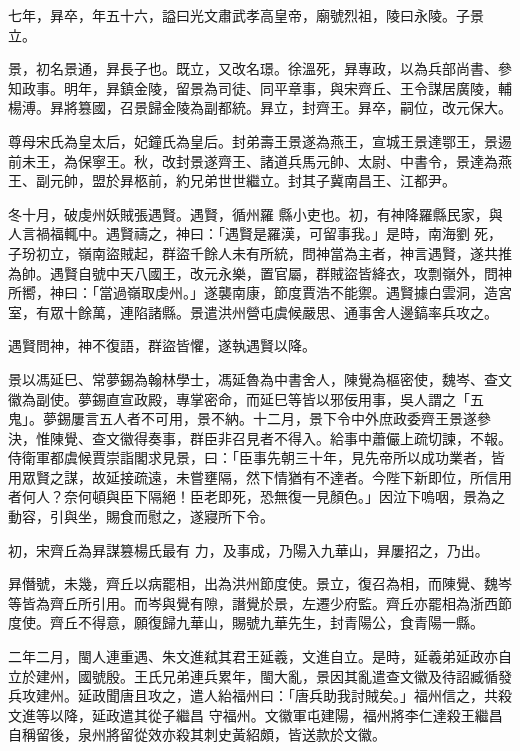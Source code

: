 \begin{pinyinscope}
 七年，昪卒，年五十六，謚曰光文肅武孝高皇帝，廟號烈祖，陵曰永陵。子景
 立。



 景，初名景通，昪長子也。既立，又改名璟。徐溫死，昪專政，以為兵部尚書、參知政事。明年，昪鎮金陵，留景為司徒、同平章事，與宋齊丘、王令謀居廣陵，輔楊溥。昪將篡國，召景歸金陵為副都統。昪立，封齊王。昪卒，嗣位，改元保大。



 尊母宋氏為皇太后，妃鐘氏為皇后。封弟壽王景遂為燕王，宣城王景達鄂王，景逷前未王，為保寧王。秋，改封景遂齊王、諸道兵馬元帥、太尉、中書令，景達為燕王、副元帥，盟於昪柩前，約兄弟世世繼立。封其子冀南昌王、江都尹。



 冬十月，破虔州妖賊張遇賢。遇賢，循州羅
 縣小吏也。初，有神降羅縣民家，與人言禍福輒中。遇賢禱之，神曰：「遇賢是羅漢，可留事我。」是時，南海劉死，子玢初立，嶺南盜賊起，群盜千餘人未有所統，問神當為主者，神言遇賢，遂共推為帥。遇賢自號中天八國王，改元永樂，置官屬，群賊盜皆絳衣，攻剽嶺外，問神所嚮，神曰：「當過嶺取虔州。」遂襲南康，節度賈浩不能禦。遇賢據白雲洞，造宮室，有眾十餘萬，連陷諸縣。景遣洪州營屯虞候嚴思、通事舍人邊鎬率兵攻之。



 遇賢問神，神不復語，群盜皆懼，遂執遇賢以降。



 景以馮延巳、常夢錫為翰林學士，馮延魯為中書舍人，陳覺為樞密使，魏岑、查文
 徽為副使。夢錫直宣政殿，專掌密命，而延巳等皆以邪佞用事，吳人謂之「五鬼」。夢錫屢言五人者不可用，景不納。十二月，景下令中外庶政委齊王景遂參決，惟陳覺、查文徽得奏事，群臣非召見者不得入。給事中蕭儼上疏切諫，不報。侍衛軍都虞候賈崇詣閣求見景，曰：「臣事先朝三十年，見先帝所以成功業者，皆用眾賢之謀，故延接疏遠，未嘗壅隔，然下情猶有不達者。今陛下新即位，所信用者何人？奈何頓與臣下隔絕！臣老即死，恐無復一見顏色。」因泣下嗚咽，景為之動容，引與坐，賜食而慰之，遂寢所下令。



 初，宋齊丘為昪謀篡楊氏最有
 力，及事成，乃陽入九華山，昪屢招之，乃出。



 昪僭號，未幾，齊丘以病罷相，出為洪州節度使。景立，復召為相，而陳覺、魏岑等皆為齊丘所引用。而岑與覺有隙，譖覺於景，左遷少府監。齊丘亦罷相為浙西節度使。齊丘不得意，願復歸九華山，賜號九華先生，封青陽公，食青陽一縣。



 二年二月，閩人連重遇、朱文進弒其君王延羲，文進自立。是時，延羲弟延政亦自立於建州，國號殷。王氏兄弟連兵累年，閩大亂，景因其亂遣查文徽及待詔臧循發兵攻建州。延政聞唐且攻之，遣人紿福州曰：「唐兵助我討賊矣。」福州信之，共殺文進等以降，延政遣其從子繼昌
 守福州。文徽軍屯建陽，福州將李仁達殺王繼昌自稱留後，泉州將留從效亦殺其刺史黃紹頗，皆送款於文徽。




\end{pinyinscope}
